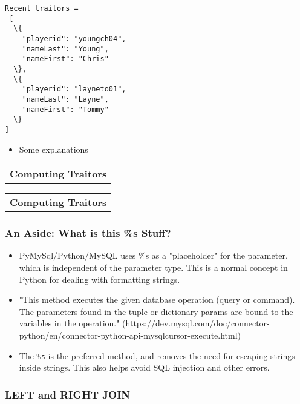 \documentclass[11pt]{article}
\providecommand{\tightlist}{%
      \setlength{\itemsep}{0pt}\setlength{\parskip}{0pt}}
\begin{document}
    \begin{Verbatim}[commandchars=\\\{\}]
Recent traitors = 
 [
  \{
    "playerid": "youngch04",
    "nameLast": "Young",
    "nameFirst": "Chris"
  \},
  \{
    "playerid": "layneto01",
    "nameLast": "Layne",
    "nameFirst": "Tommy"
  \}
]

    \end{Verbatim}

    \begin{itemize}
\tightlist
\item
  Some explanations
\end{itemize}

\begin{longtable}[]{@{}c@{}}
\toprule
\tabularnewline
\midrule
\endhead
\textbf{Computing Traitors}\tabularnewline
\bottomrule
\end{longtable}

    \begin{longtable}[]{@{}c@{}}
\toprule
\tabularnewline
\midrule
\endhead
\textbf{Computing Traitors}\tabularnewline
\bottomrule
\end{longtable}

    \subsubsection{An Aside: What is this \%s
Stuff?}\label{an-aside-what-is-this-s-stuff}

\begin{itemize}
\item
  PyMySql/Python/MySQL uses \%s as a "placeholder" for the parameter,
  which is independent of the parameter type. This is a normal concept
  in Python for dealing with formatting strings.
\item
  "This method executes the given database operation (query or command).
  The parameters found in the tuple or dictionary params are bound to
  the variables in the operation."
  (https://dev.mysql.com/doc/connector-python/en/connector-python-api-mysqlcursor-execute.html)
\item
  The \texttt{\%s} is the preferred method, and removes the need for
  escaping strings inside strings. This also helps avoid SQL injection
  and other errors.
\end{itemize}

    \subsubsection{LEFT and RIGHT JOIN}\label{left-and-right-join}
\end{document}
